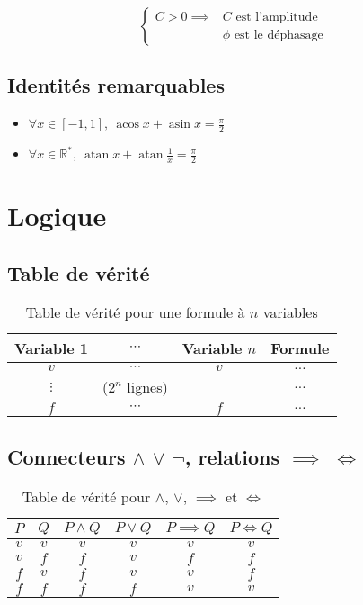 \documentclass{article}
\newcommand{\R}{{\mathbb R}}
\begin{document}
\[
	
	\begin{cases}
		C > 0 \implies &\text{$C$ est l'amplitude} \\
					   &\text{$\phi$ est le déphasage}
	\end{cases}
\] 
\subsection{Identités remarquables}
\begin{itemize}
	\item $\forall x \in [-1, 1],\ \operatorname{acos} x + \operatorname{asin} x = \frac{\pi}{2}$
	\item $\forall x \in \R^\ast,\ \operatorname{atan} x + \operatorname{atan} \frac{1}{x} = \frac{\pi}{2}$
\end{itemize}


\newpage
\section{Logique}

\subsection{Table de vérité}

\begin{table}[H]
	\centering
	\begin{tabular}{ccc|c}
	Variable 1 & $\cdots$ & Variable $n$ & Formule \\\hline
	$v$ & $\cdots$ & $v$ & $\ldots$ \\
	$\vdots$ & ($2^n$ lignes) & & $\ldots$\\
	$f$ & $\cdots$ & $f$ & $\ldots$
	\end{tabular}
	\caption{Table de vérité pour une formule à $n$ variables}
	\label{tab:table_verité_cas_général}
\end{table}

\subsection{Connecteurs $\land$ $\lor$ $\lnot$, relations $\implies$ $\iff$}

\begin{table}[H]
	\centering
	\begin{tabular}{cc|cccc}
	$P$ & $Q$ & $P\land Q$ & $P \lor Q$ & $P \implies Q$ & $P \iff Q$ \\\hline
	$v$ & $v$ & $v$ & $v$ & $v$ & $v$ \\
	$v$ & $f$ & $f$ & $v$ & $f$ & $f$ \\
	$f$ & $v$ & $f$ & $v$ & $v$ & $f$ \\
	$f$ & $f$ & $f$ & $f$ & $v$ & $v$ \\
	\end{tabular}
	\caption{Table de vérité pour $\land$, $\lor$, $\implies$ et $\iff$}
	\label{tab:table_vérité_et_ou_implication_équivalence}
\end{table}
\end{document}
